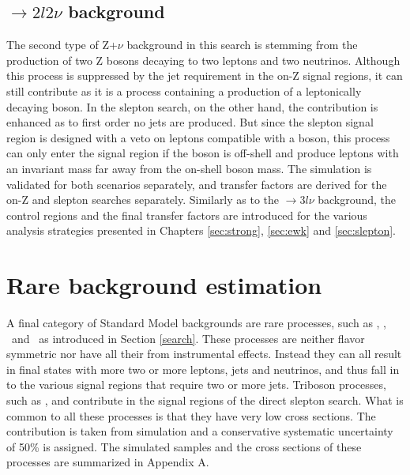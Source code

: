 \subsection*{\PZZ$\rightarrow 2l2\nu$ background}\label{ZZ}
\noindent
\justify
The second type of Z+$\nu$ background in this search is stemming from the production of two Z bosons decaying to two leptons and two neutrinos. 
Although this process is suppressed by the jet requirement in the on-Z signal regions, it can still contribute as it is a process containing a production of a leptonically decaying \PZ boson. 
In the slepton search, on the other hand, the contribution is enhanced as to first order no jets are produced. 
But since the slepton signal region is designed with a veto on leptons compatible with a \PZ boson, this process can only enter the signal region if the \PZ boson is off-shell and produce leptons with an invariant mass far away from the on-shell \PZ boson mass. 
The simulation is validated for both scenarios separately, and transfer factors are derived for the on-Z and slepton searches separately. 
Similarly as to the \PWZ$\rightarrow3l\nu$ background, the control regions and the final transfer factors are introduced for the various analysis strategies presented in Chapters \ref{sec:strong}, \ref{sec:ewk} and \ref{sec:slepton}. 
\section{Rare background estimation}
\noindent\justify
A final category of Standard Model backgrounds are rare processes, such as  \ttW, \ttH, \tWZ\ and \tZq\ as introduced in Section \ref{search}. 
These processes are neither flavor symmetric nor have all their \ptmiss from instrumental effects. 
Instead they can all result in final states with more two or more leptons, jets and neutrinos, and thus fall in to the various signal regions that require two or more jets. 
Triboson processes, such as \PWWZ, \PWZZ and \PZZZ contribute in the signal regions of the direct slepton search. 
What is common to all these processes is that they have very low cross sections. 
The contribution is taken from simulation and a conservative systematic uncertainty of 50\% is assigned.
The simulated samples and the cross sections of these processes are summarized in Appendix A.  
